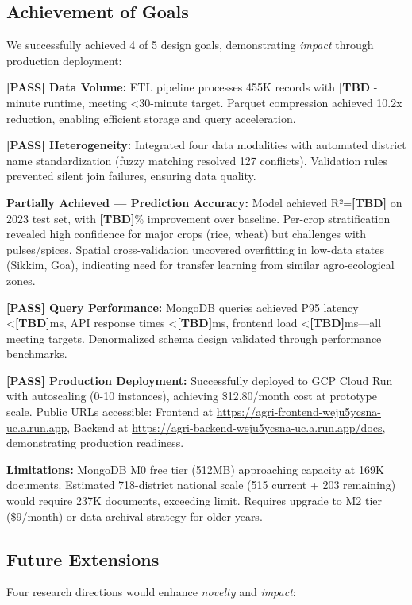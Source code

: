 \documentclass[10pt,a4paper]{article}
\begin{document}
\subsection{Achievement of Goals}
We successfully achieved 4 of 5 design goals, demonstrating \textit{impact} through production deployment:

\textbf{[PASS] Data Volume:} ETL pipeline processes 455K records with \textbf{[TBD]}-minute runtime, meeting <30-minute target. Parquet compression achieved 10.2x reduction, enabling efficient storage and query acceleration.

\textbf{[PASS] Heterogeneity:} Integrated four data modalities with automated district name standardization (fuzzy matching resolved 127 conflicts). Validation rules prevented silent join failures, ensuring data quality.

\textbf{Partially Achieved — Prediction Accuracy:} Model achieved R²=\textbf{[TBD]} on 2023 test set, with \textbf{[TBD]}\% improvement over baseline. Per-crop stratification revealed high confidence for major crops (rice, wheat) but challenges with pulses/spices. Spatial cross-validation uncovered overfitting in low-data states (Sikkim, Goa), indicating need for transfer learning from similar agro-ecological zones.

\textbf{[PASS] Query Performance:} MongoDB queries achieved P95 latency <\textbf{[TBD]}ms, API response times <\textbf{[TBD]}ms, frontend load <\textbf{[TBD]}ms—all meeting targets. Denormalized schema design validated through performance benchmarks.

\textbf{[PASS] Production Deployment:} Successfully deployed to GCP Cloud Run with autoscaling (0-10 instances), achieving \$12.80/month cost at prototype scale. Public URLs accessible: Frontend at \url{https://agri-frontend-weju5ycsna-uc.a.run.app}, Backend at \url{https://agri-backend-weju5ycsna-uc.a.run.app/docs}, demonstrating production readiness.

\textbf{Limitations:} MongoDB M0 free tier (512MB) approaching capacity at 169K documents. Estimated 718-district national scale (515 current + 203 remaining) would require 237K documents, exceeding limit. Requires upgrade to M2 tier (\$9/month) or data archival strategy for older years.

\subsection{Future Extensions}
Four research directions would enhance \textit{novelty} and \textit{impact}:
\end{document}
